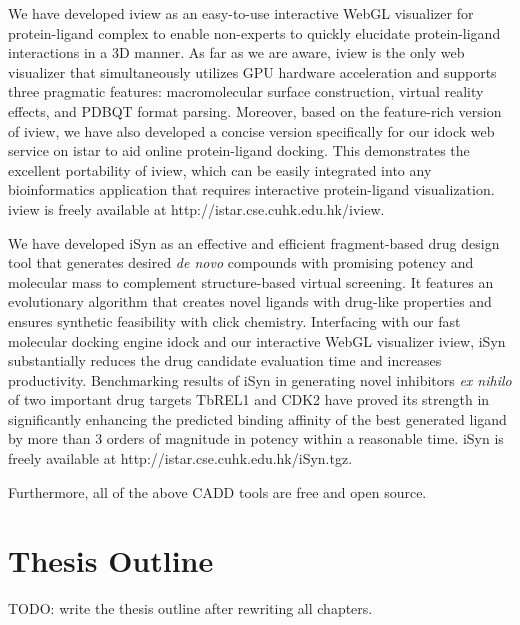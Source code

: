 
We have developed iview as an easy-to-use interactive WebGL visualizer for protein-ligand complex to enable non-experts to quickly elucidate protein-ligand interactions in a 3D manner. As far as we are aware, iview is the only web visualizer that simultaneously utilizes GPU hardware acceleration and supports three pragmatic features: macromolecular surface construction, virtual reality effects, and PDBQT format parsing. Moreover, based on the feature-rich version of iview, we have also developed a concise version specifically for our idock web service on istar to aid online protein-ligand docking. This demonstrates the excellent portability of iview, which can be easily integrated into any bioinformatics application that requires interactive protein-ligand visualization. iview is freely available at http://istar.cse.cuhk.edu.hk/iview.

We have developed iSyn as an effective and efficient fragment-based drug design tool that generates desired \textit{de novo} compounds with promising potency and molecular mass to complement structure-based virtual screening. It features an evolutionary algorithm that creates novel ligands with drug-like properties and ensures synthetic feasibility with click chemistry. Interfacing with our fast molecular docking engine idock and our interactive WebGL visualizer iview, iSyn substantially reduces the drug candidate evaluation time and increases productivity. Benchmarking results of iSyn in generating novel inhibitors \textit{ex nihilo} of two important drug targets TbREL1 and CDK2 have proved its strength in significantly enhancing the predicted binding affinity of the best generated ligand by more than 3 orders of magnitude in potency within a reasonable time. iSyn is freely available at http://istar.cse.cuhk.edu.hk/iSyn.tgz.

Furthermore, all of the above CADD tools are free and open source.

\section{Thesis Outline}

TODO: write the thesis outline after rewriting all chapters.


\chapterend

